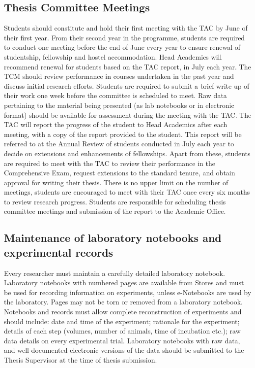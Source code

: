 \documentclass[a4paper,10pt]{article}
\begin{document}
\subsection{Thesis Committee Meetings}
Students should constitute and hold their first meeting with
the TAC by June of their first year. From their second year in the programme,
students are required to conduct one meeting before the end of June every year
to ensure renewal of studentship, fellowship and hostel accommodation. Head
Academics will recommend renewal for students based on the TAC report, in July
each year. The TCM should review performance in courses undertaken in the past
year and discuss initial research efforts.  Students are required to submit a
brief write up of their work one week before the committee is scheduled to meet. 
Raw data pertaining to the material being presented (as lab notebooks
or in electronic format) should be available for assessment during the meeting with the
TAC. The TAC will report the progress of the student to Head Academics after each
meeting, with a copy of the report provided to the student. This report will be referred to at
the Annual Review of students conducted in July each year to decide on extensions and
enhancements of fellowships. Apart from these, students are required to meet with the TAC
to review their performance in the Comprehensive Exam, request extensions to the standard
tenure, and obtain approval for writing their thesis. There is no upper limit on the number of
meetings, students are encouraged to meet with their TAC once every six months to review
research progress. Students are responsible for scheduling thesis committee meetings and
submission of the report to the Academic Office.

\subsection{Maintenance of laboratory notebooks and experimental records} Every
researcher must maintain a carefully detailed laboratory notebook. Laboratory
notebooks with numbered pages are available from Stores and must be used for
recording information on experiments, unless e-Notebooks are used by the
laboratory. Pages may not be torn or removed from a laboratory notebook.
Notebooks and records must allow complete reconstruction of experiments and
should include: date and time of the experiment; rationale for the experiment;
details of each step (volumes, number of animals, time of incubation etc.); raw
data details on every experimental trial. Laboratory notebooks with raw data,
and well documented electronic versions of the data should be submitted to the
Thesis Supervisor at the time of thesis submission.
\end{document}
